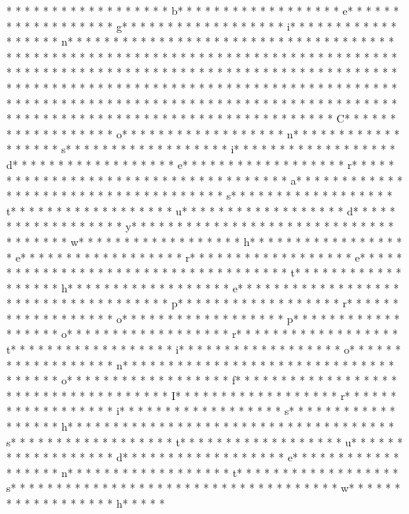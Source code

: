 * * *  * * *  * * *  *  * * *  *  * * *  * b* * *  * * *  * * *  *  * * *  *  * * *  * e* * *  * * *  * * *  *  * * *  *  * * *  * g* * *  * * *  * * *  *  * * *  *  * * *  * i* * *  * * *  * * *  *  * * *  *  * * *  * n* * *  * * *  * * *  *  * * *  *  * * *  * {* * *  * * *  * * *  *  * * *  *  * * *  *  * * *  * * *  * * *  *  * * *  *  * * *  * }* * *  * * *  * * *  *  * * *  *  * * *  * 
* * *  * * *  * * *  *  * * *  *  * * *  * * *  * * *  *  * * *  *  * * *  * * *  * * *  *  * * *  *  * * *  *  * * *  * * *  * * *  *  * * *  *  * * *  *  * * *  * * *  * * *  *  * * *  *  * * *  *  * * *  * * *  * * *  *  * * *  *  * * *  *  * * *  * * *  * * *  *  * * *  *  * * *  *  * * *  * * *  * * *  *  * * *  *  * * *  *  * * *  * * *  * * *  *  * * *  *  * * *  *  * * *  * * *  * * *  *  * * *  *  * * *  * C* * *  * * *  * * *  *  * * *  *  * * *  * o* * *  * * *  * * *  *  * * *  *  * * *  * n* * *  * * *  * * *  *  * * *  *  * * *  * s* * *  * * *  * * *  *  * * *  *  * * *  * i* * *  * * *  * * *  *  * * *  *  * * *  * d* * *  * * *  * * *  *  * * *  *  * * *  * e* * *  * * *  * * *  *  * * *  *  * * *  * r* * *  * * *  * * *  *  * * *  *  * * *  *  * * *  * * *  * * *  *  * * *  *  * * *  * a* * *  * * *  * * *  *  * * *  *  * * *  *  * * *  * * *  * * *  *  * * *  *  * * *  * s* * *  * * *  * * *  *  * * *  *  * * *  * t* * *  * * *  * * *  *  * * *  *  * * *  * u* * *  * * *  * * *  *  * * *  *  * * *  * d* * *  * * *  * * *  *  * * *  *  * * *  * y* * *  * * *  * * *  *  * * *  *  * * *  *  * * *  * * *  * * *  *  * * *  *  * * *  * w* * *  * * *  * * *  *  * * *  *  * * *  * h* * *  * * *  * * *  *  * * *  *  * * *  * e* * *  * * *  * * *  *  * * *  *  * * *  * r* * *  * * *  * * *  *  * * *  *  * * *  * e* * *  * * *  * * *  *  * * *  *  * * *  *  * * *  * * *  * * *  *  * * *  *  * * *  * t* * *  * * *  * * *  *  * * *  *  * * *  * h* * *  * * *  * * *  *  * * *  *  * * *  * e* * *  * * *  * * *  *  * * *  *  * * *  *  * * *  * * *  * * *  *  * * *  *  * * *  * p* * *  * * *  * * *  *  * * *  *  * * *  * r* * *  * * *  * * *  *  * * *  *  * * *  * o* * *  * * *  * * *  *  * * *  *  * * *  * p* * *  * * *  * * *  *  * * *  *  * * *  * o* * *  * * *  * * *  *  * * *  *  * * *  * r* * *  * * *  * * *  *  * * *  *  * * *  * t* * *  * * *  * * *  *  * * *  *  * * *  * i* * *  * * *  * * *  *  * * *  *  * * *  * o* * *  * * *  * * *  *  * * *  *  * * *  * n* * *  * * *  * * *  *  * * *  *  * * *  *  * * *  * * *  * * *  *  * * *  *  * * *  * o* * *  * * *  * * *  *  * * *  *  * * *  * f* * *  * * *  * * *  *  * * *  *  * * *  *  * * *  * * *  * * *  *  * * *  *  * * *  * I* * *  * * *  * * *  *  * * *  *  * * *  * r* * *  * * *  * * *  *  * * *  *  * * *  * i* * *  * * *  * * *  *  * * *  *  * * *  * s* * *  * * *  * * *  *  * * *  *  * * *  * h* * *  * * *  * * *  *  * * *  *  * * *  *  * * *  * * *  * * *  *  * * *  *  * * *  * s* * *  * * *  * * *  *  * * *  *  * * *  * t* * *  * * *  * * *  *  * * *  *  * * *  * u* * *  * * *  * * *  *  * * *  *  * * *  * d* * *  * * *  * * *  *  * * *  *  * * *  * e* * *  * * *  * * *  *  * * *  *  * * *  * n* * *  * * *  * * *  *  * * *  *  * * *  * t* * *  * * *  * * *  *  * * *  *  * * *  * s* * *  * * *  * * *  *  * * *  *  * * *  *  * * *  * * *  * * *  *  * * *  *  * * *  * w* * *  * * *  * * *  *  * * *  *  * * *  * h* * *  * * 